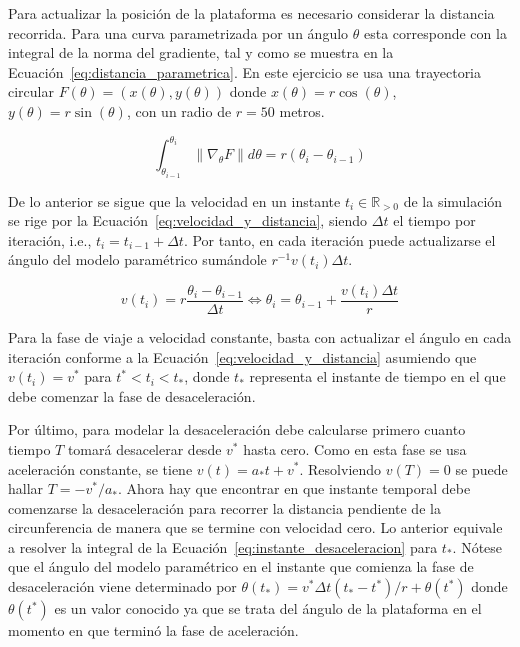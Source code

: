 \documentclass[]{article}
\begin{document}
	Para actualizar la posición de la plataforma es necesario considerar la distancia recorrida. Para una curva parametrizada por un ángulo $\theta$ esta corresponde con la integral de la norma del gradiente, tal y como se muestra en la Ecuación~\ref{eq:distancia_parametrica}. En este ejercicio se usa una trayectoria circular $F(\theta) = (x(\theta), y(\theta))$ donde $x(\theta)=r \cos(\theta)$, $y(\theta) = r \sin(\theta)$, con un radio de $r=50$ metros.
	
	\begin{equation}
		\int_{\theta_{i-1}}^{\theta_{i}} \lVert\nabla_{\theta} F\rVert d\theta = r(\theta_i - \theta_{i-1})
	\label{eq:distancia_parametrica}
	\end{equation}

	De lo anterior se sigue que la velocidad en un instante $t_i \in \mathbb{R}_{>0}$ de la simulación se rige por la Ecuación~\ref{eq:velocidad_y_distancia}, siendo $\Delta t$ el tiempo por iteración, i.e., $t_{i} = t_{i-1} + \Delta t$. Por tanto, en cada iteración puede actualizarse el ángulo del modelo paramétrico sumándole $r^{-1}v(t_i)\Delta t$.
	
	\begin{equation}
		v(t_i) = r \dfrac{\theta_{i} - \theta_{i-1}}{\Delta t} \iff \theta_i = \theta_{i-1} + \dfrac{v(t_i)\Delta t}{r}
	\label{eq:velocidad_y_distancia}		
	\end{equation}
	
	Para la fase de viaje a velocidad constante, basta con actualizar el ángulo en cada iteración conforme a la Ecuación~\ref{eq:velocidad_y_distancia} asumiendo que $v(t_i) = v^*$ para $t^* < t_i < t_*$, donde $t_*$ representa el instante de tiempo en el que debe comenzar la fase de desaceleración.
	
	Por último, para modelar la desaceleración debe calcularse primero cuanto tiempo $T$ tomará desacelerar desde $v^*$ hasta cero. Como en esta fase se usa aceleración constante, se tiene $v(t) = a_*t+v^*$. Resolviendo $v(T)=0$ se puede hallar $T=-v^*/a_*$. Ahora hay que encontrar en que instante temporal debe comenzarse la desaceleración para recorrer la distancia pendiente de la circunferencia de manera que se termine con velocidad cero. Lo anterior equivale a resolver la integral de la Ecuación~\ref{eq:instante_desaceleracion} para $t_*$. Nótese que el ángulo del modelo paramétrico en el instante que comienza la fase de desaceleración viene determinado por $\theta(t_*) =  v^* \Delta{t} (t_* - t^*)/r + \theta(t^*)$ donde $\theta(t^*)$ es un valor conocido ya que se trata del ángulo de la plataforma en el momento en que terminó la fase de aceleración.
	
\end{document}
